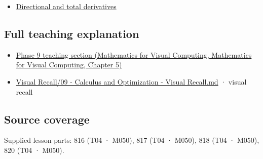 \begin{itemize}
\tightlist
\item
  \hyperref[appendix-e2d476574aab]{Directional and total derivatives}
\end{itemize}

\subsection{Full teaching explanation}\label{appendix-677b59746ae0-full-teaching-explanation}

\begin{itemize}
\tightlist
\item
  \href{../02-Mathematics-for-Visual-Computing/main.pdf\#nameddest=02-foundations-ii-ch021-multivariable-derivatives-and-sensitivity-1}{Phase 9 teaching section (Mathematics for Visual Computing, Mathematics for Visual Computing, Chapter 5)}
\item
  \hyperref[appendix-adf48f5dc5c1]{Visual Recall/09 - Calculus and Optimization - Visual Recall.md} · visual recall
\end{itemize}

\subsection{Source coverage}\label{appendix-677b59746ae0-source-coverage}

Supplied lesson parts: 816 (T04 · M050), 817 (T04 · M050), 818 (T04 · M050), 820 (T04 · M050).
